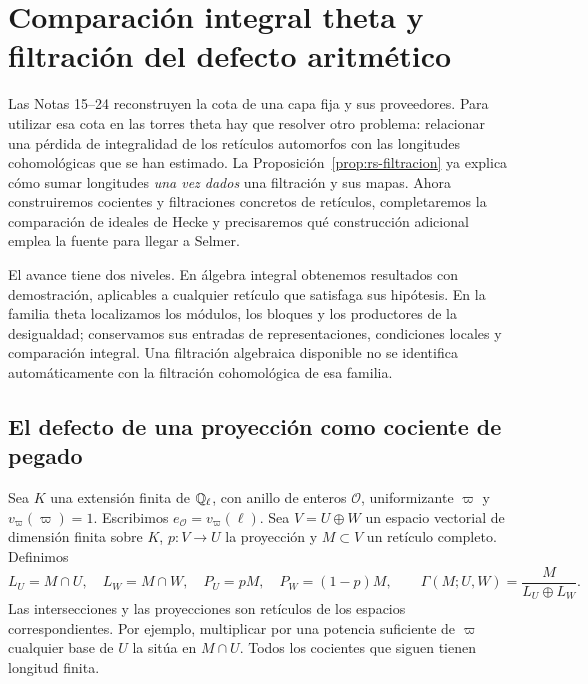 \section{Comparación integral theta y filtración del defecto aritmético}
\label{sec:theta-integral}


Las Notas 15--24 reconstruyen la cota de una capa fija y sus
proveedores. Para utilizar esa cota en las torres theta hay que resolver
otro problema: relacionar una pérdida de integralidad de los retículos
automorfos con las longitudes cohomológicas que se han estimado.
La Proposición~\ref{prop:rs-filtracion} ya explica cómo sumar longitudes
\emph{una vez dados} una filtración y sus mapas. Ahora construiremos
cocientes y filtraciones concretos de retículos, completaremos la
comparación de ideales de Hecke y precisaremos qué construcción
adicional emplea la fuente para llegar a Selmer.

El avance tiene dos niveles. En álgebra integral obtenemos resultados
con demostración, aplicables a cualquier retículo que satisfaga sus
hipótesis. En la familia theta localizamos los módulos, los bloques y
los productores de la desigualdad; conservamos sus entradas de
representaciones, condiciones locales y comparación integral.
Una filtración algebraica disponible no se identifica automáticamente
con la filtración cohomológica de esa familia.

\subsection{El defecto de una proyección como cociente de pegado}

Sea $K$ una extensión finita de $\mathbb{Q}_\ell$, con anillo de enteros
$\mathcal O$, uniformizante $\varpi$ y $v_\varpi(\varpi)=1$.
Escribimos $e_{\mathcal O}=v_\varpi(\ell)$.
Sea $V=U\oplus W$ un espacio vectorial de dimensión finita sobre $K$,
$p:V\to U$ la proyección y $M\subset V$ un retículo completo.
Definimos
\begin{equation}
 L_U=M\cap U,\quad L_W=M\cap W,\quad
 P_U=pM,\quad P_W=(1-p)M,\qquad
 \Gamma(M;U,W)=\frac{M}{L_U\oplus L_W}.
 \label{eq:ti-pegado}
\end{equation}
Las intersecciones y las proyecciones son retículos de los espacios
correspondientes. Por ejemplo, multiplicar por una potencia suficiente
de $\varpi$ cualquier base de $U$ la sitúa en $M\cap U$.
Todos los cocientes que siguen tienen longitud finita.

